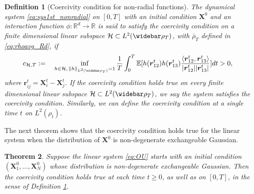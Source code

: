 \documentclass[]{elsarticle}
\def\R{\mathbb{R}}
\def\E{\mathbb{E}}
\newcommand{\wbar}\widebar
\newcommand{\mbf}[1]{\boldsymbol{#1}}
\newcommand{\innerp}[2]{\langle #1,#2 \rangle}
\newcommand{\br}{\mbf{r}}
\newcommand{\bX}{\mbf{X}}
\newtheorem{theorem}{Theorem}
\newtheorem{definition}[theorem]{Definition}
\numberwithin{equation}{section}
\numberwithin{theorem}{section}
\begin{document}
\begin{definition}[Coercivity condition for non-radial functions] \label{def_coercivty_Rd}
The %
dynamical system \eqref{eq:sys1st_nonradial} on $[0,T]$ with an initial condition $\bX^0$ and an interaction function $\phi:\R^d\to\R$ is said to satisfy the coercivity condition on a finite dimensional linear subspace $\mathcal{H}\subset L^2(\wbar \rho_T)$, with $\bar \rho_T$ defined in \eqref{eq:rhoavg_Rd}, 
if
\begin{equation} \label{eq:coercivityDef_Rd}
c_{\mathcal{H},T} : = \quad \inf_{h\in  \mathcal{H}, \, \|h\|_{L^2(\wbar \rho_T)}=1}\frac{1}{T}\int_{0}^T \E[h(\br_{12}^t)h(\br_{13}^t)\frac{\innerp{\br_{12}^t}{\br_{13}^t}}{|\br_{12}^t||\br_{13}^t|} ]dt >0,
\end{equation}
where $\br_{ij}^t = \bX^{t}_i- \bX^t_j$. If the coercivity condition holds true on every finite dimensional linear subspace $\mathcal{H} \subset L^2(\wbar \rho_T)$, we say the system satisfies the coercivity condition. Similarly, we can define the coercivity condition at a single time $t$ on $L^2(\rho_t)$. 
\end{definition}

The next theorem shows that the coercivity condition holds true for the linear system when the distribution of $\bX^0$ is non-degenerate exchangeable Gaussian. 
\begin{theorem} \label{thm:OU_non-radial}
Suppose the linear system \eqref{eq:OU} %
starts with an initial condition $(\bX_1^0,\ldots,\bX_N^0)$ whose distribution is non-degenerate exchangeable Gaussian. Then the coercivity condition holds true at each time $t\geq 0$, as well as on $[0,T]$, in the sense of Definition {\rm \ref{def_coercivty_Rd}}.
\end{theorem}
\end{document}
